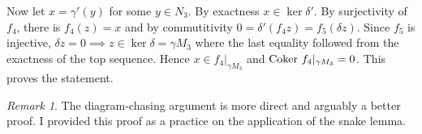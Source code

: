 \documentclass{article}
\theoremstyle{definition}
\theoremstyle{remark}
\newtheorem{remark}[theorem]{Remark}
\begin{document}
\begin{enumerate}[(1)]
\begin{enumerate}[(a)]
                Now let $x = \gamma'(y)$ for some $y \in N_3$. By exactness $x \in \ker \delta'$. By surjectivity of $f_4$, there is  $f_4(z) =  x$ and by commutitivity $0 = \delta'(f_4z) = f_5(\delta z)$. Since $f_5$ is injective, $\delta z = 0 \implies z \in \ker \delta  = \gamma M_3$ where the last equality followed from the exactness of the top sequence. Hence $x \in f_4|_{\gamma M_3}$ and $\mathrm{Coker\ } f_4|_{\gamma M_3} = 0$. This proves the statement.
        \end{enumerate}
        \begin{remark}
          The diagram-chasing argument is more direct and arguably a better proof. I provided this proof as a practice on the application of the snake lemma.
        \end{remark}

\end{enumerate}
\end{document}

